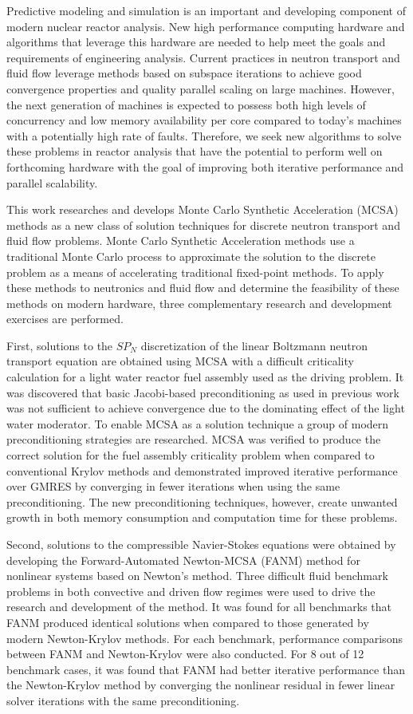 Predictive modeling and simulation is an important and developing
component of modern nuclear reactor analysis. New high performance
computing hardware and algorithms that leverage this hardware are
needed to help meet the goals and requirements of engineering
analysis. Current practices in neutron transport and fluid flow
leverage methods based on subspace iterations to achieve good
convergence properties and quality parallel scaling on large
machines. However, the next generation of machines is expected to
possess both high levels of concurrency and low memory availability
per core compared to today's machines with a potentially high rate of
faults. Therefore, we seek new algorithms to solve these problems in
reactor analysis that have the potential to perform well on
forthcoming hardware with the goal of improving both iterative
performance and parallel scalability.

This work researches and develops Monte Carlo Synthetic Acceleration
(MCSA) methods as a new class of solution techniques for discrete
neutron transport and fluid flow problems. Monte Carlo Synthetic
Acceleration methods use a traditional Monte Carlo process to
approximate the solution to the discrete problem as a means of
accelerating traditional fixed-point methods. To apply these methods
to neutronics and fluid flow and determine the feasibility of these
methods on modern hardware, three complementary research and
development exercises are performed.

First, solutions to the $SP_N$ discretization of the linear Boltzmann
neutron transport equation are obtained using MCSA with a difficult
criticality calculation for a light water reactor fuel assembly used
as the driving problem. It was discovered that basic Jacobi-based
preconditioning as used in previous work was not sufficient to achieve
convergence due to the dominating effect of the light water
moderator. To enable MCSA as a solution technique a group of modern
preconditioning strategies are researched. MCSA was verified to
produce the correct solution for the fuel assembly criticality problem
when compared to conventional Krylov methods and demonstrated improved
iterative performance over GMRES by converging in fewer iterations
when using the same preconditioning. The new preconditioning
techniques, however, create unwanted growth in both memory consumption
and computation time for these problems.

Second, solutions to the compressible Navier-Stokes equations were
obtained by developing the Forward-Automated Newton-MCSA (FANM) method
for nonlinear systems based on Newton's method. Three difficult fluid
benchmark problems in both convective and driven flow regimes were
used to drive the research and development of the method. It was found
for all benchmarks that FANM produced identical solutions when
compared to those generated by modern Newton-Krylov methods. For each
benchmark, performance comparisons between FANM and Newton-Krylov were
also conducted. For 8 out of 12 benchmark cases, it was found that
FANM had better iterative performance than the Newton-Krylov method by
converging the nonlinear residual in fewer linear solver iterations
with the same preconditioning.


